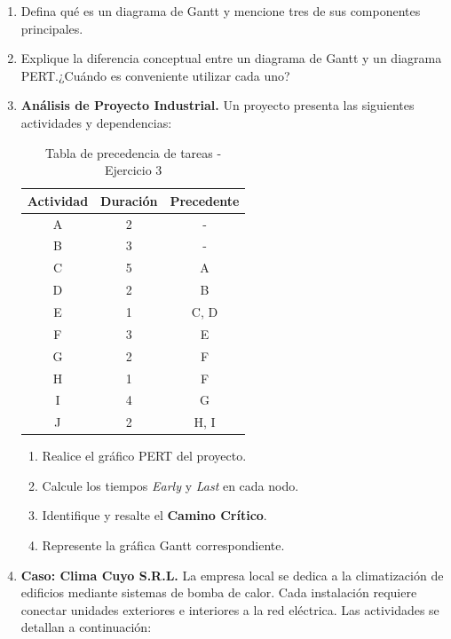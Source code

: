 \documentclass[../main]{subfiles}
\begin{document}
\begin{enumerate}
  \item Defina qué es un diagrama de Gantt y mencione tres de sus
    componentes principales.
  \item Explique la diferencia conceptual entre un diagrama de Gantt
    y un diagrama PERT.\@ ¿Cuándo es conveniente utilizar cada uno?

  \item \textbf{Análisis de Proyecto Industrial.}
    Un proyecto presenta las siguientes actividades y dependencias:

    \begin{table}[h!]
      \centering
      \begin{tabular}{|c|c|c|} \hline
        \textbf{Actividad} & \textbf{Duración} & \textbf{Precedente}
        \\ \hline \hline
        A & 2 & - \\
        B & 3 & - \\
        C & 5 & A \\
        D & 2 & B \\
        E & 1 & C, D \\
        F & 3 & E \\
        G & 2 & F \\
        H & 1 & F \\
        I & 4 & G \\
        J & 2 & H, I \\ \hline
      \end{tabular}
      \caption{Tabla de precedencia de tareas - Ejercicio 3}
      \label{tab:ejercicio_3}
    \end{table}

    \begin{enumerate}
      \item Realice el gráfico PERT del proyecto.
      \item Calcule los tiempos \textit{Early} y \textit{Last} en cada nodo.
      \item Identifique y resalte el \textbf{Camino Crítico}.
      \item Represente la gráfica Gantt correspondiente.
    \end{enumerate}

  \item \textbf{Caso: Clima Cuyo S.R.L.}
    La empresa local se dedica a la climatización de edificios
    mediante sistemas de bomba de calor. Cada instalación requiere
    conectar unidades exteriores e interiores a la red eléctrica. Las
    actividades se detallan a continuación:


\end{enumerate}
\end{document}
